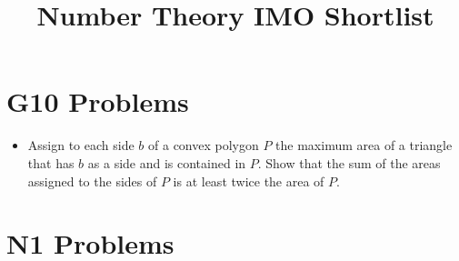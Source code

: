 \documentclass[11pt]{scrartcl}
\begin{document}
\newpage
\section*{G10 Problems}  \label{G10}
\begin{itemize}[leftmargin=*]
 
    \item {}  Assign to each side $b$ of a convex polygon $P$ the maximum area of a triangle that has $b$ as a side and is contained in $P$. Show that the sum of the areas assigned to the sides of $P$ is at least twice the area of $P$.
\end{itemize}



\newpage
 
\title{Number Theory IMO Shortlist}



\section*{N1 Problems} \label{N1}
\end{document}
